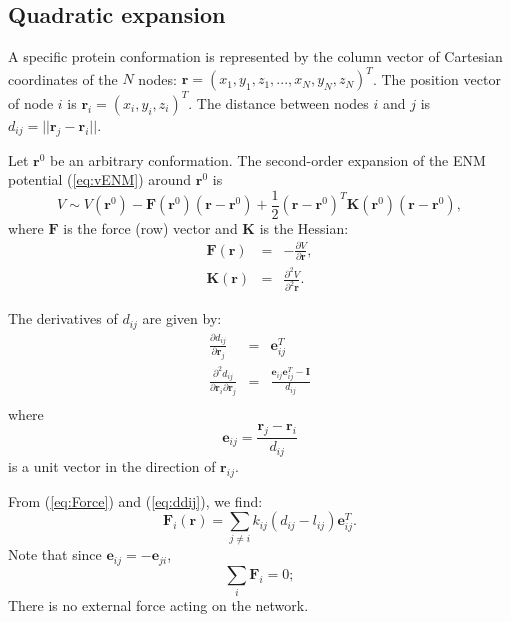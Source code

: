 \documentclass[12pt]{article}
\newcommand{\lij}{l_{ij}}
\newcommand{\kij}{k_{ij}}
\newcommand{\dij}{d_{ij}}
\newcommand{\rvector}{\mathbf{r}}
\newcommand{\rvectorZero}{\mathbf{r}^0}
\newcommand{\ri}{\mathbf{r}_i}
\newcommand{\rj}{\mathbf{r}_j}
\newcommand{\rij}{\mathbf{r}_{ij}}
\newcommand{\kmat}{\mathbf{K}}
\newcommand{\eij}{\mathbf{e}_{ij}}
\newcommand{\eji}{\mathbf{e}_{ji}}
\begin{document}
\subsection{Quadratic expansion}

A specific protein conformation is represented by the column vector of  Cartesian coordinates of the $N$ nodes: $\rvector = (x_1,y_1,z_1,...,x_N,y_N,z_N)^T$. The position vector of node $i$ is $ \ri = (x_i,y_i,z_i)^T $. The distance between nodes $i$ and $j$ is $\dij = || \rj - \ri ||$. 

Let $\rvectorZero$ be an arbitrary conformation. The second-order expansion of the ENM potential (\ref{eq:vENM}) around $\rvectorZero$ is
\begin{equation} \label{eq:vENM_quadratic_rzero}
\boxed{
V \sim 
	V(\rvectorZero) - 
    \mathbf{F}(\rvectorZero)  (\rvector - \rvectorZero) +
	\frac{1}{2} (\rvector - \rvectorZero)^T \kmat(\rvectorZero) (\rvector - \rvectorZero),
}
\end{equation}
where $\mathbf{F}$ is the force (row) vector and $\kmat$ is the Hessian:
\begin{eqnarray}
\mathbf{F}(\rvector) & = & 
    -  \frac{\partial V}{\partial \rvector}, \label{eq:Force} \\ 
\kmat (\rvector) & = & \frac{\partial^2 V}{\partial^2 \rvector}. \label{eq:Hessian}
\end{eqnarray}

The derivatives of $\dij$ are given by:
\begin{eqnarray} 
\label{eq:ddij}
	\frac{\partial \dij}{\partial \rj } & = & \eij^T \\
\label{eq:ddij2}
	\frac{\partial^2 \dij}{\partial \ri \partial \rj} & = & \frac{\eij \eij^T - \mathbf{I}}{\dij}\\
\end{eqnarray}
where 
\begin{equation}
\eij  = \frac{\rj - \ri}{\dij}
\end{equation}
is a unit vector in the direction of $ \rij$.

From (\ref{eq:Force}) and  (\ref{eq:ddij}), we find:
\begin{equation} \label{eq:force_i}
\boxed{
	\mathbf{F}_i(\rvector) = \sum_{j \neq i} \kij (\dij - \lij) \eij^T.
}
\end{equation}
Note that since $\eij = -\eji$, 
\begin{equation}
	\sum_{i} \mathbf{F}_i = 0;
\end{equation}
There is no external force acting on the network.
\end{document}
